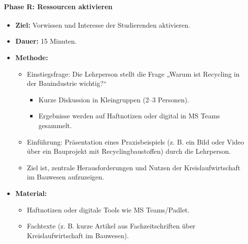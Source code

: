 \documentclass[
11pt,
captions=tableheading,
smallheadings,
headsepline,
footsepline, 
captions=tableheading,
parskip=half-,
]{scrartcl}
\begin{document}
\paragraph{Phase R: Ressourcen aktivieren}
\begin{itemize}
    \item \textbf{Ziel:} Vorwissen und Interesse der Studierenden aktivieren.
    \item \textbf{Dauer:} 15 Minuten.
    \item \textbf{Methode:}
          \begin{itemize}
              \item Einstiegsfrage: Die Lehrperson stellt die Frage „Warum ist Recycling in der Bauindustrie wichtig?“
                    \begin{itemize}
                        \item Kurze Diskussion in Kleingruppen (2–3 Personen).
                        \item Ergebnisse werden auf Haftnotizen oder digital in MS Teams gesammelt.
                    \end{itemize}
              \item Einführung: Präsentation eines Praxisbeispiels (z. B. ein Bild oder Video über ein Bauprojekt mit Recyclingbaustoffen) durch die Lehrperson.
              \item Ziel ist, zentrale Herausforderungen und Nutzen der Kreislaufwirtschaft im Bauwesen aufzuzeigen.
          \end{itemize}
    \item \textbf{Material:}
          \begin{itemize}
              \item Haftnotizen oder digitale Tools wie MS Teams/Padlet.
              \item Fachtexte (z. B. kurze Artikel aus Fachzeitschriften über Kreislaufwirtschaft im Bauwesen).
          \end{itemize}
\end{itemize}
\end{document}
